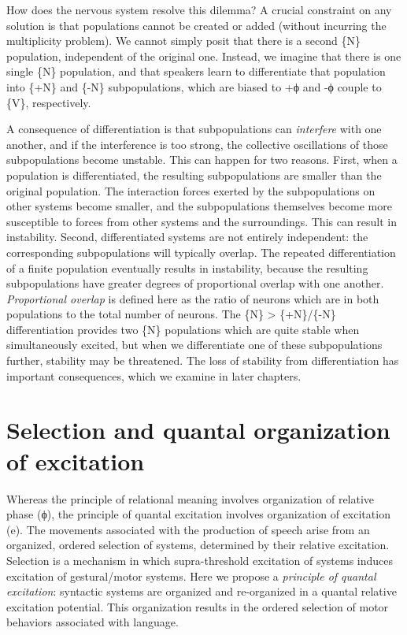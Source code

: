   How does the nervous system resolve this dilemma? A crucial constraint on any solution is that populations cannot be created or added (without incurring the multiplicity problem). We cannot simply posit that there is a second \{N\} population, independent of the original one. Instead, we imagine that there is one single \{N\} population, and that speakers learn to differentiate that population into \{+N\} and \{-N\} subpopulations, which are biased to +ϕ and -ϕ couple to \{V\}, respectively.

  A consequence of differentiation is that subpopulations can \textit{interfere} with one another, and if the interference is too strong, the collective oscillations of those subpopulations become unstable. This can happen for two reasons. First, when a population is differentiated, the resulting subpopulations are smaller than the original population. The interaction forces exerted by the subpopulations on other systems become smaller, and the subpopulations themselves become more susceptible to forces from other systems and the surroundings. This can result in instability. Second, differentiated systems are not entirely independent: the corresponding subpopulations will typically overlap. The repeated differentiation of a finite population eventually results in instability, because the resulting subpopulations have greater degrees of proportional overlap with one another. \textit{Proportional overlap} is defined here as the ratio of neurons which are in both populations to the total number of neurons. The \{N\} > \{+N\}/\{-N\} differentiation provides two \{N\} populations which are quite stable when simultaneously excited, but when we differentiate one of these subpopulations further, stability may be threatened. The loss of stability from differentiation has important consequences, which we examine in later chapters.

\section{Selection and quantal organization of excitation}

Whereas the principle of relational meaning involves organization of relative phase (ϕ), the principle of quantal excitation involves organization of excitation (e). The movements associated with the production of speech arise from an organized, ordered selection of systems, determined by their relative excitation. Selection is a mechanism in which supra-threshold excitation of systems induces excitation of gestural/motor systems. Here we propose a \textit{principle of quantal excitation}: syntactic systems are organized and re-organized in a quantal relative excitation potential. This organization results in the ordered selection of motor behaviors associated with language.

